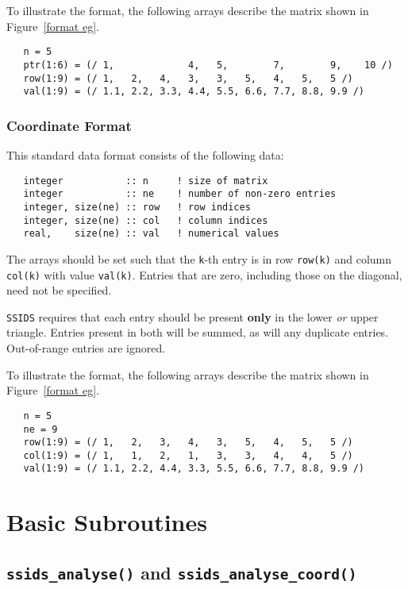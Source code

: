 \documentclass{spral}
\begin{document}
To illustrate the format, the following arrays describe the matrix shown in
Figure~\ref{format eg}.
\begin{verbatim}
   n = 5
   ptr(1:6) = (/ 1,             4,   5,        7,        9,    10 /)
   row(1:9) = (/ 1,   2,   4,   3,   3,   5,   4,   5,   5 /)
   val(1:9) = (/ 1.1, 2.2, 3.3, 4.4, 5.5, 6.6, 7.7, 8.8, 9.9 /)
\end{verbatim}

\subsubsection{Coordinate Format} \label{coordformat}
This standard data format consists of the following data:
\begin{verbatim}
   integer           :: n     ! size of matrix
   integer           :: ne    ! number of non-zero entries
   integer, size(ne) :: row   ! row indices
   integer, size(ne) :: col   ! column indices
   real,    size(ne) :: val   ! numerical values
\end{verbatim}
The arrays should be set such that the \texttt{k}-th entry is in row
\texttt{row(k)} and column \texttt{col(k)} with value \texttt{val(k)}.
Entries that are zero, including those on the diagonal, need not be specified.

\texttt{SSIDS} requires that each entry should be present \textbf{only} in the
lower \textit{or} upper triangle. Entries present in both will be summed, as
will any duplicate entries. Out-of-range entries are ignored.

To illustrate the format, the following arrays describe the matrix shown in
Figure~\ref{format eg}.
\begin{verbatim}
   n = 5
   ne = 9
   row(1:9) = (/ 1,   2,   3,   4,   3,   5,   4,   5,   5 /)
   col(1:9) = (/ 1,   1,   2,   1,   3,   3,   4,   4,   5 /)
   val(1:9) = (/ 1.1, 2.2, 4.4, 3.3, 5.5, 6.6, 7.7, 8.8, 9.9 /)
\end{verbatim}


\section{Basic Subroutines}


\subsection{\texttt{ssids\_analyse()} and \texttt{ssids\_analyse\_coord()}}\label{analyse}
\end{document}
